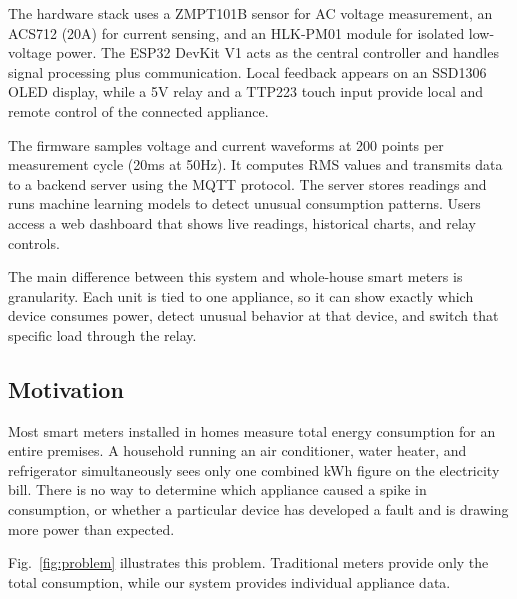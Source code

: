 \documentclass[12pt, a4paper]{article}
\numberwithin{figure}{section}
\numberwithin{table}{section}
\begin{document}
	The hardware stack uses a ZMPT101B sensor for AC voltage measurement, an ACS712 (20A) for current sensing, and an HLK-PM01 module for isolated low-voltage power. The ESP32 DevKit V1 acts as the central controller and handles signal processing plus communication. Local feedback appears on an SSD1306 OLED display, while a 5V relay and a TTP223 touch input provide local and remote control of the connected appliance.
	
	The firmware samples voltage and current waveforms at 200 points per measurement cycle (20ms at 50Hz). It computes RMS values and transmits data to a backend server using the MQTT protocol. The server stores readings and runs machine learning models to detect unusual consumption patterns. Users access a web dashboard that shows live readings, historical charts, and relay controls.
	
	The main difference between this system and whole-house smart meters is granularity. Each unit is tied to one appliance, so it can show exactly which device consumes power, detect unusual behavior at that device, and switch that specific load through the relay.
	
	\subsection{Motivation}
	
	Most smart meters installed in homes measure total energy consumption for an entire premises. A household running an air conditioner, water heater, and refrigerator simultaneously sees only one combined kWh figure on the electricity bill. There is no way to determine which appliance caused a spike in consumption, or whether a particular device has developed a fault and is drawing more power than expected.
	
	Fig.~\ref{fig:problem} illustrates this problem. Traditional meters provide only the total consumption, while our system provides individual appliance data.
	
\end{document}
